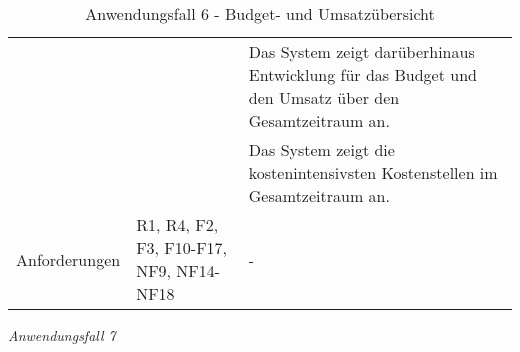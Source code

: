 \begin{table}[h]
\begin{adjustbox}{max width=\textwidth}
\begin{tabular}{lp{7.0cm}p{7.0cm}}
                                         & &Das System zeigt darüberhinaus Entwicklung für das Budget und den Umsatz über den Gesamtzeitraum an.\\
                                         & &Das System zeigt die kostenintensivsten Kostenstellen im Gesamtzeitraum an.\\

        Anforderungen                   &R1, R4, F2, F3, F10-F17, NF9, NF14-NF18& -\\
        \bottomrule
    \end{tabular}
    \end{adjustbox}
    \caption{%
    Anwendungsfall 6 - Budget- und Umsatzübersicht   }
    \label{tab:AF_BudgetUmsatz}
    \end{table}
\endgroup



\clearpage
\noindent
\textit{Anwendungsfall 7}

